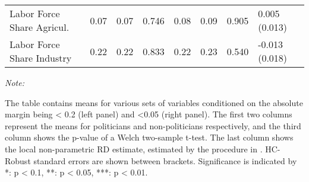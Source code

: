 \begin{table}[!h]
{\begin{threeparttable}
\begin{tabular}[t]{llllllll}
\hspace{1em}Labor Force Share Agricul. & \num{0.07} & \num{0.07} & 0.746 & \num{0.08} & \num{0.09} & 0.905 & 0.005 (0.013)\\
\hspace{1em}Labor Force Share Industry & \num{0.22} & \num{0.22} & 0.833 & \num{0.22} & \num{0.23} & 0.540 & -0.013 (0.018)\\
\bottomrule
\end{tabular}
\begin{tablenotes}[para]
\item \textit{Note: } 
\item The table contains means for various sets of variables conditioned on the absolute margin being < 0.2 (left panel) and <0.05 (right panel). The first two columns represent the means for politicians and non-politicians respectively, and the third column shows the p-value of a Welch two-sample t-test. The last column shows the local non-parametric RD estimate, estimated by the procedure in \cite{cattaneo2019practical}. HC-Robust standard errors are shown between brackets. Significance is indicated by *: p < 0.1, **: p < 0.05, ***: p < 0.01.
\end{tablenotes}
\end{threeparttable}}
\end{table}

